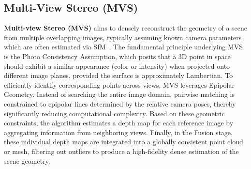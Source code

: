 \subsection{Multi-View Stereo (MVS)}
\textbf{Multi-view Stereo (MVS)} aims to densely reconstruct the geometry of a scene from multiple overlapping images, typically assuming known camera parameters which are often estimated via SfM~\cite{wang2025vggt}.
The fundamental principle underlying MVS is the Photo Consistency Assumption, which posits that a 3D point in space should exhibit a similar appearance (color or intensity) when projected onto different image planes, provided the surface is approximately Lambertian. To efficiently identify corresponding points across views, MVS leverages Epipolar Geometry. Instead of searching the entire image domain, pairwise matching is constrained to epipolar lines determined by the relative camera poses, thereby significantly reducing computational complexity. Based on these geometric constraints, the algorithm estimates a depth map for each reference image by aggregating information from neighboring views. Finally, in the Fusion stage, these individual depth maps are integrated into a globally consistent point cloud or mesh, filtering out outliers to produce a high-fidelity dense estimation of the scene geometry.

